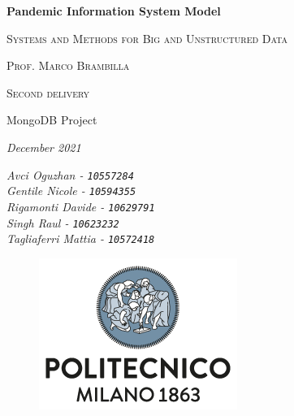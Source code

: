 \documentclass[12pt, a4paper]{article}
\begin{document}

\begin{titlepage}
    \centering
    {\Huge\bfseries Pandemic Information System Model\par} %
    \vspace{1.5cm}
    {\scshape\large Systems and Methods for Big and Unstructured Data \par} %
    \vspace{0.5cm}
    {\scshape\large Prof. Marco Brambilla \par} %
    \vspace{1cm}
    {\scshape\large %
        Second delivery \par 
        MongoDB Project \par 
    }
    \vspace{0.5cm}
    {\slshape\large December 2021 \par} %
    \vspace{1cm}
    \linespread{0.8} %
    {\large\itshape %
        Avci Oguzhan - \texttt{10557284}\\
        Gentile Nicole - \texttt{10594355}\\
        Rigamonti Davide - \texttt{10629791}\\
        Singh Raul - \texttt{10623232}\\
        Tagliaferri Mattia - \texttt{10572418}
    }
    \vfill
    \begin{figure}[b]
        \includegraphics[scale=0.6]{polimi.png} %
        \centering
    \end{figure}


\end{titlepage}

\end{document}
